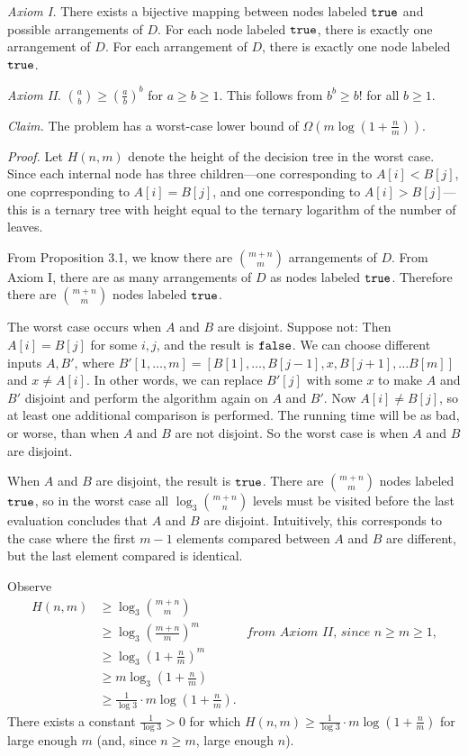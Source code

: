 \begin{enumerate}
\begin{solution}
\textit{Axiom I. }There exists a bijective mapping between nodes labeled $\mathtt{true}$ and possible arrangements of $D$. For each node labeled $\mathtt{true}$, there is exactly one arrangement of $D$. For each arrangement of $D$, there is exactly one node labeled $\mathtt{true}$.

\textit{Axiom II. }$\binom{a}{b}\geq\left(\frac{a}{b}\right)^b$ for $a\geq b\geq 1$. This follows from $b^b\geq b!$ for all $b\geq 1$.

\textit{Claim. }The problem has a worst-case lower bound of $\Omega\left(m\log\left(1+\frac{n}{m}\right)\right)$.

\textit{Proof. }Let $H(n,m)$ denote the height of the decision tree in the worst case. Since each internal node has three children---one corresponding to $A[i]<B[j]$, one coprresponding to $A[i]=B[j]$, and one corresponding to $A[i]>B[j]$---this is a ternary tree with height equal to the ternary logarithm of the number of leaves.

From Proposition 3.1, we know there are $\binom{m+n}{m}$ arrangements of $D$. From Axiom I, there are as many arrangements of $D$ as nodes labeled $\mathtt{true}$. Therefore there are $\binom{m+n}{m}$ nodes labeled $\mathtt{true}$.

The worst case occurs when $A$ and $B$ are disjoint. Suppose not: Then $A[i]=B[j]$ for some $i,j$, and the result is $\mathtt{false}$. We can choose different inputs $A,B'$, where $B'[1,\dots,m]=[B[1],\dots,B[j-1],x,B[j+1],\dots B[m]]$ and $x\neq A[i]$. In other words, we can replace $B'[j]$ with some $x$ to make $A$ and $B'$ disjoint and perform the algorithm again on $A$ and $B'$. Now $A[i]\neq B[j]$, so at least one additional comparison is performed. The running time will be as bad, or worse, than when $A$ and $B$ are not disjoint. So the worst case is when $A$ and $B$ are disjoint.

When $A$ and $B$ are disjoint, the result is $\mathtt{true}$. There are $\binom{m+n}{m}$ nodes labeled $\mathtt{true}$, so in the worst case all $\log_3\binom{m+n}{n}$ levels must be visited before the last evaluation concludes that $A$ and $B$ are disjoint. Intuitively, this corresponds to the case where the first $m-1$ elements compared between $A$ and $B$ are different, but the last element compared is identical.

Observe
\begin{align*}
H(n,m)&\geq\log_3\binom{m+n}{m}\\
&\geq\log_3\left(\frac{m+n}{m}\right)^m&\textit{from Axiom II, since $n\geq m\geq 1$,}\\
&\geq\log_3\left(1+\frac{n}{m}\right)^m\\
&\geq m\log_3\left(1+\frac{n}{m}\right)\\
&\geq\frac{1}{\log{3}}\cdot m\log\left(1+\frac{n}{m}\right).
\end{align*}
There exists a constant $\frac{1}{\log{3}}>0$ for which $H(n,m)\geq\frac{1}{\log{3}}\cdot m\log\left(1+\frac{n}{m}\right)$ for large enough $m$ (and, since $n\geq m$, large enough $n$).


\end{solution}
\end{enumerate}
